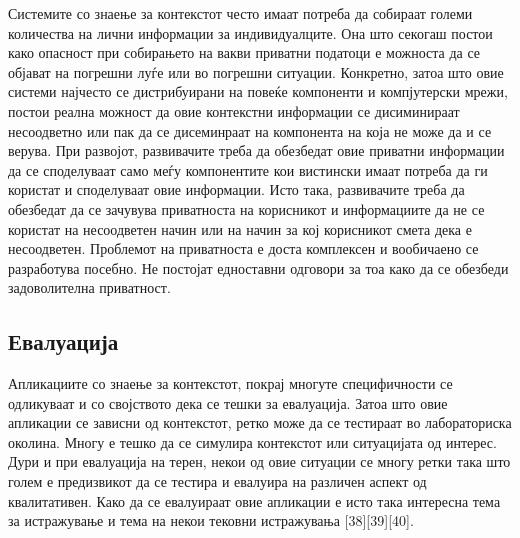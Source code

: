 Системите со знаење за контекстот често имаат потреба да собираат големи
количества на лични информации за индивидуалците. Она што секогаш постои како
опасност при собирањето на вакви приватни податоци е можноста да се објават на
погрешни луѓе или во погрешни ситуации. Конкретно, затоа што овие системи
најчесто се дистрибуирани на повеќе компоненти и компјутерски мрежи, постои
реална можност да овие контекстни информации се дисиминираат несоодветно или пак
да се дисеминраат на компонента на која не може да и се верува. При развојот,
развивачите треба да обезбедат овие приватни информации да се споделуваат само
меѓу компонентите кои вистински имаат потреба да ги користат и споделуваат овие
информации. Исто така, развивачите треба да обезбедат да се зачувува приватноста
на корисникот и информациите да не се користат на несоодветен начин или на начин
за кој корисникот смета дека е несоодветен. Проблемот на приватноста е доста
комплексен и вообичаено се разработува посебно. Не постојат едноставни одговори
за тоа како да се обезбеди задоволителна приватност.

\subsection{Евалуација}    

Апликациите со знаење за контекстот, покрај многуте специфичности се одликуваат
и со својството дека се тешки за евалуација. Затоа што овие апликации се зависни
од контекстот, ретко може да се тестираат во лабораториска околина. Многу е
тешко да се симулира контекстот или ситуацијата од интерес. Дури и при
евалуација на терен, некои од овие ситуации се многу ретки така што голем е
предизвикот да се тестира и евалуира на различен аспект од квалитативен. Како да
се евалуираат овие апликации е исто така интересна тема за истражување и тема на
некои тековни истражувања [38][39][40].
